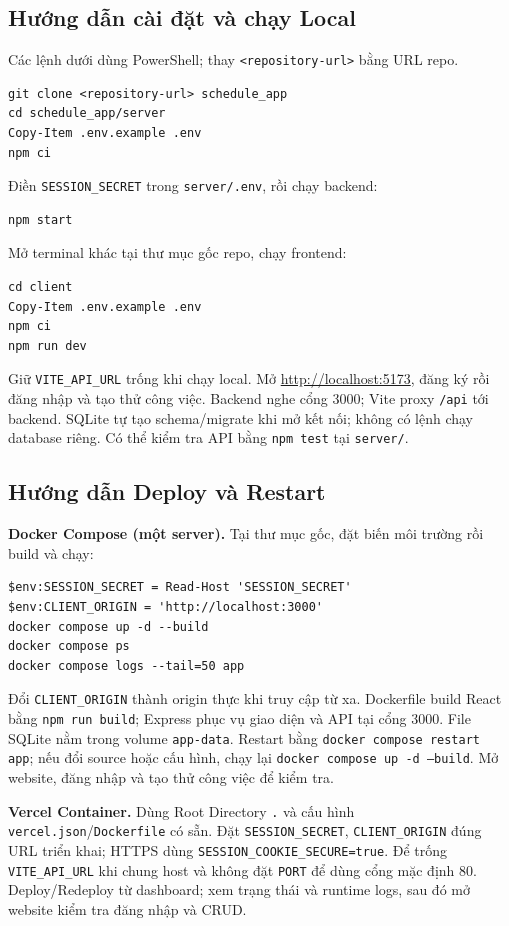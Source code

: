 \subsection{Hướng dẫn cài đặt và chạy Local}
Các lệnh dưới dùng PowerShell; thay \texttt{<repository-url>} bằng URL repo.
\begin{verbatim}
git clone <repository-url> schedule_app
cd schedule_app/server
Copy-Item .env.example .env
npm ci
\end{verbatim}
Điền \texttt{SESSION\_SECRET} trong \texttt{server/.env}, rồi chạy backend:
\begin{verbatim}
npm start
\end{verbatim}
Mở terminal khác tại thư mục gốc repo, chạy frontend:
\begin{verbatim}
cd client
Copy-Item .env.example .env
npm ci
npm run dev
\end{verbatim}
Giữ \texttt{VITE\_API\_URL} trống khi chạy local. Mở \url{http://localhost:5173}, đăng ký rồi đăng nhập và tạo thử công việc. Backend nghe cổng 3000; Vite proxy \texttt{/api} tới backend. SQLite tự tạo schema/migrate khi mở kết nối; không có lệnh chạy database riêng. Có thể kiểm tra API bằng \texttt{npm test} tại \texttt{server/}.

\subsection{Hướng dẫn Deploy và Restart}
\textbf{Docker Compose (một server).} Tại thư mục gốc, đặt biến môi trường rồi build và chạy:
\begin{verbatim}
$env:SESSION_SECRET = Read-Host 'SESSION_SECRET'
$env:CLIENT_ORIGIN = 'http://localhost:3000'
docker compose up -d --build
docker compose ps
docker compose logs --tail=50 app
\end{verbatim}
Đổi \texttt{CLIENT\_ORIGIN} thành origin thực khi truy cập từ xa. Dockerfile build React bằng \texttt{npm run build}; Express phục vụ giao diện và API tại cổng 3000. File SQLite nằm trong volume \texttt{app-data}. Restart bằng \texttt{docker compose restart app}; nếu đổi source hoặc cấu hình, chạy lại \texttt{docker compose up -d --build}. Mở website, đăng nhập và tạo thử công việc để kiểm tra.

\textbf{Vercel Container.} Dùng Root Directory \texttt{.} và cấu hình \texttt{vercel.json}/\texttt{Dockerfile} có sẵn. Đặt \texttt{SESSION\_SECRET}, \texttt{CLIENT\_ORIGIN} đúng URL triển khai; HTTPS dùng \texttt{SESSION\_COOKIE\_SECURE=true}. Để trống \texttt{VITE\_API\_URL} khi chung host và không đặt \texttt{PORT} để dùng cổng mặc định 80. Deploy/Redeploy từ dashboard; xem trạng thái và runtime logs, sau đó mở website kiểm tra đăng nhập và CRUD.


